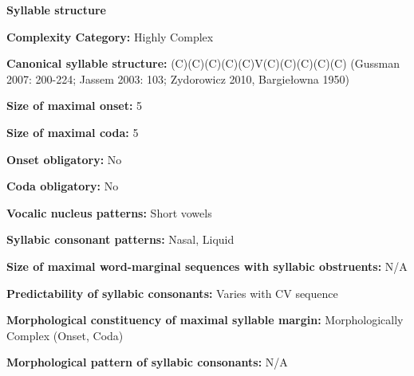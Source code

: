 \begin{styleBody}
\textbf{Syllable structure}
\end{styleBody}

\begin{styleBody}
\textbf{Complexity Category:} Highly Complex
\end{styleBody}

\begin{styleBody}
\textbf{Canonical syllable structure:} (C)(C)(C)(C)(C)V(C)(C)(C)(C)(C)\textbf{ }(Gussman 2007: 200-224; Jassem 2003: 103; Zydorowicz 2010, Bargiełowna 1950)
\end{styleBody}

\begin{styleBody}
\textbf{Size of maximal onset:} 5
\end{styleBody}

\begin{styleBody}
\textbf{Size of maximal coda:} 5
\end{styleBody}

\begin{styleBody}
\textbf{Onset obligatory:} No
\end{styleBody}

\begin{styleBody}
\textbf{Coda obligatory:} No
\end{styleBody}

\begin{styleBody}
\textbf{Vocalic nucleus patterns:} Short vowels
\end{styleBody}

\begin{styleBody}
\textbf{Syllabic consonant patterns:} Nasal, Liquid
\end{styleBody}

\begin{styleBody}
\textbf{Size of maximal word{}-marginal sequences with syllabic obstruents:} N/A
\end{styleBody}

\begin{styleBody}
\textbf{Predictability of syllabic consonants:} Varies with CV sequence
\end{styleBody}

\begin{styleBody}
\textbf{Morphological constituency of maximal syllable margin:} Morphologically Complex (Onset, Coda)
\end{styleBody}

\begin{styleBody}
\textbf{Morphological pattern of syllabic consonants:} N/A
\end{styleBody}

